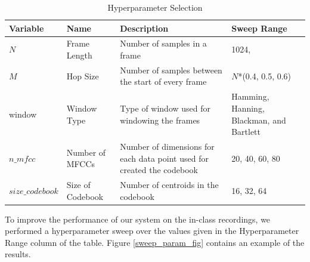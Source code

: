 \documentclass[conference]{IEEEtran}
\begin{document}
    \begin{table}
        \caption{Hyperparameter Selection}
        \label{tab:hyperparameters}
        \begin{tabularx}{\columnwidth}{|X|X|X|X|}
            \hline
            \textbf{Variable} & \textbf{Name} & \textbf{Description} & \textbf{Sweep Range}\\
            \hline
            $N$ & Frame Length & Number of samples in a frame & 1024, \\
            \hline
            $M$ & Hop Size & Number of samples between the start of every frame & $N$*(0.4, 0.5, 0.6)\\
            \hline
            window & Window Type & Type of window used for windowing the frames & Hamming, Hanning, Blackman, and Bartlett\\
            \hline
            $n\_mfcc$ & Number of MFCCs & Number of dimensions for each data point used for created the codebook & 20, 40, 60, 80\\
            \hline
            $size\_codebook$ & Size of Codebook & Number of centroids in the codebook & 16, 32, 64\\
            \hline
        \end{tabularx}
    \end{table}

    To improve the performance of our system on the in-class recordings, we performed a hyperparameter sweep over the values given in the Hyperparameter Range column of the table. Figure \ref{sweep_param_fig} contains an example of the results.
\end{document}
